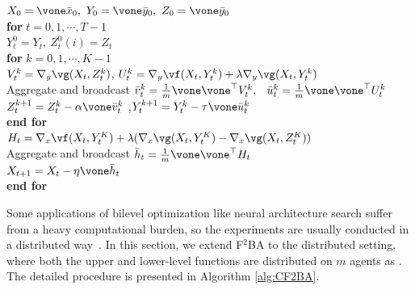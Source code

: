 \documentclass{article}
\begin{document}
\begin{algorithm*}[t]  
\caption{Distributed F${}^2$BA $\left(\bar x_0,\bar y_0, \eta,\tau,\alpha, \lambda, T,K\right)$} \label{alg:CF2BA}
\begin{algorithmic}[1] 
\STATE $ X_0 = \vone  \bar x_0, ~ Y_0 = \vone  \bar y_0,~ Z_0 = \vone  \bar y_0$ \\[1mm]
\STATE \textbf{for} $ t =0,1,\cdots,T-1 $ \\[1mm]
\STATE \quad $ Y_t^0 =  Y_{t}, ~ Z_t^0(i) = Z_{t}$ \\[1mm]
\STATE \quad \textbf{for} $ k =0,1,\cdots,K-1$ \\[1mm]
\STATE \quad \quad  $ V_t^{k} = \nabla_y \vg(X_t, Z_t^k)$, \quad  $U_t^{k} =  \nabla_y \vf(X_t,Y_t^k) +  \lambda  \nabla_y \vg(X_t,Y_t^k) $ \\[1mm]
\STATE \quad \quad Aggregate and broadcast $\bar v_t^{k} = \frac{1}{m} \vone \vone^\top V_t^k, $~ $\bar u_t^{k} = \frac{1}{m} \vone   \vone^\top U_t^k$ \\[1mm]
\STATE \quad \quad  $ Z_t^{k+1} = Z_t^k - \alpha \vone   \bar v_t^k   $ ,\quad  $ Y_t^{k+1} = Y_t^k - \tau \vone \bar u_t^k   $ \\[1mm]
\STATE \quad \textbf{end for} \\[1mm]
\STATE \quad $ H_t= \nabla_x \vf(X_t,Y_{t}^K) + \lambda ( \nabla_x \vg(X_t,Y_{t}^K) - \nabla_x \vg(X_t,Z_{t}^K) )$ \\[1mm]
\STATE \quad Aggregate and broadcast $\bar h_t = \frac{1}{m} \vone   \vone^\top H_t$ \\[1mm]
\STATE \quad $X_{t+1} = X_t -  \eta  \vone  \bar h_t$ \\[1mm]
\STATE \textbf{end for} \\[1mm]
\end{algorithmic}
\end{algorithm*}


Some applications of bilevel optimization like neural architecture search suffer from a heavy computational burden, so the experiments are usually conducted in a distributed way~\citep{chen2019progressive}.
In this section, we extend
F${}^2$BA to the distributed setting, where both the upper and lower-level functions are distributed on $m$ agents as . The detailed procedure is presented in Algorithm \ref{alg:CF2BA}.
\end{document}
